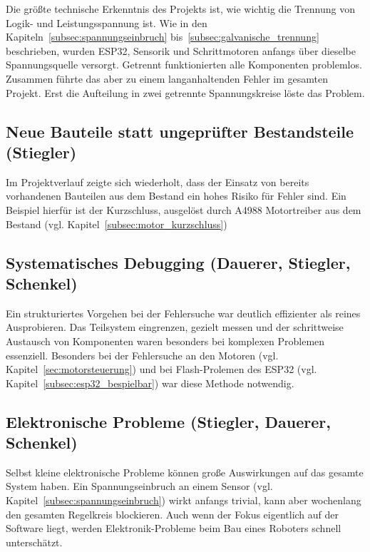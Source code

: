 \documentclass[fontsize=12pt,
parskip=half,	%
department=FakM,  %
logostyle=flat,
twoside, %
DIV=15,BCOR=10mm, %
]{OTHRreprt}
\begin{document}
Die größte technische Erkenntnis des Projekts ist, wie wichtig die Trennung von Logik- und Leistungsspannung ist. Wie in den Kapiteln~\ref{subsec:spannungseinbruch} bis~\ref{subsec:galvanische_trennung} beschrieben, wurden ESP32, Sensorik und Schrittmotoren anfangs über dieselbe Spannungsquelle versorgt. Getrennt funktionierten alle Komponenten problemlos. Zusammen führte das aber zu einem langanhaltenden Fehler im gesamten Projekt. Erst die Aufteilung in zwei getrennte Spannungskreise löste das Problem.

\subsection{Neue Bauteile statt ungeprüfter Bestandsteile (Stiegler)}
\label{subsec:lessons_bauteile}

Im Projektverlauf zeigte sich wiederholt, dass der Einsatz von bereits vorhandenen Bauteilen aus dem Bestand ein hohes Risiko für Fehler sind. Ein Beispiel hierfür ist der Kurzschluss, ausgelöst durch A4988 Motortreiber aus dem Bestand (vgl. Kapitel~\ref{subsec:motor_kurzschluss})

\subsection{Systematisches Debugging (Dauerer, Stiegler, Schenkel)}
\label{subsec:lessons_debugging}

Ein strukturiertes Vorgehen bei der Fehlersuche war deutlich effizienter als reines Ausprobieren. Das Teilsystem eingrenzen, gezielt messen und der schrittweise Austausch von Komponenten waren besonders bei komplexen Problemen essenziell. Besonders bei der Fehlersuche an den Motoren (vgl. Kapitel~\ref{sec:motorsteuerung}) und bei Flash-Prolemen des ESP32 (vgl. Kapitel~\ref{subsec:esp32_bespielbar}) war diese Methode notwendig.

\subsection{Elektronische Probleme (Stiegler, Dauerer, Schenkel)}
\label{subsec:lessons_elektronik_relevanz}

Selbst kleine elektronische Probleme können große Auswirkungen auf das gesamte System haben. Ein Spannungseinbruch an einem Sensor (vgl. Kapitel~\ref{subsec:spannungseinbruch}) wirkt anfangs trivial, kann aber wochenlang den gesamten Regelkreis blockieren. Auch wenn der Fokus eigentlich auf der Software liegt, werden Elektronik-Probleme beim Bau eines Roboters schnell unterschätzt.
\end{document}
